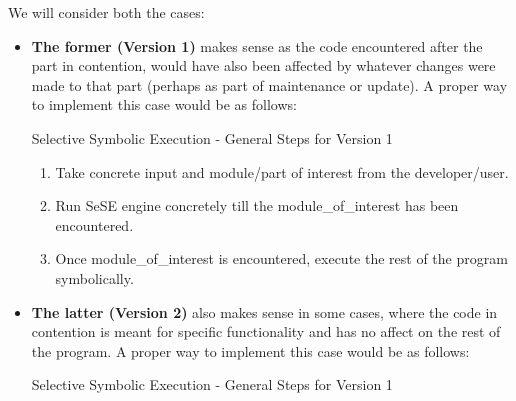 \documentclass[11pt]{llncs}
\begin{document}
		We will consider both the cases:
		\begin{itemize}
			\item \textbf{The former (Version 1)}  makes sense as the code encountered after the part in contention, would have also been affected by whatever changes were made to that part (perhaps as part of maintenance or update). A proper way to implement this case would be as follows:
				
				\vspace{2mm}

				\begin{algorithm}[H]
					\caption{Selective Symbolic Execution  - General Steps for Version 1}  \label{algorithm_4}
					
					\DontPrintSemicolon
					\SetAlgoLined
					
					\;
		
					\begin{enumerate}
						\item Take concrete input and module/part of interest from the developer/user.
						\item Run SeSE engine concretely till the module\_of\_interest has been encountered.
						\item Once module\_of\_interest is encountered, execute the rest of the program symbolically.
					\end{enumerate}
				\end{algorithm}

			\vspace{2mm}
				
			\item \textbf{The latter (Version 2)} also makes sense in some cases, where the code in contention is meant for specific functionality and has no affect on the rest of the program. A proper way to implement this case would be as follows:

				\vspace{5mm}

				\begin{algorithm}[H]
					\caption{Selective Symbolic Execution  - General Steps for Version 1}  \label{algorithm_5}
					
					\DontPrintSemicolon
					\SetAlgoLined
					

\end{algorithm}
\end{itemize}
\end{document}
